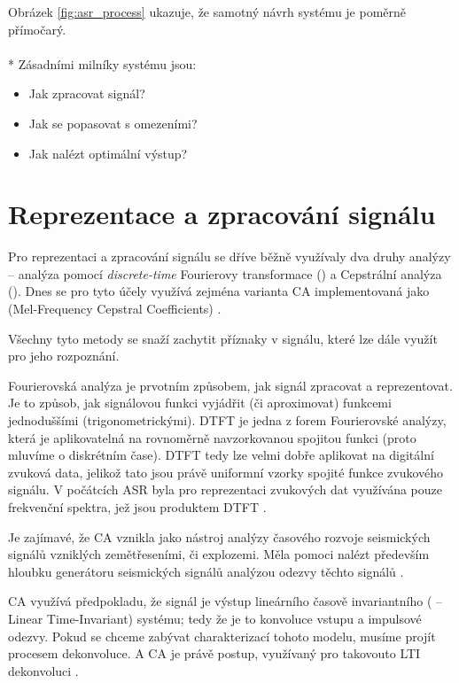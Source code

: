Obrázek \ref{fig:asr_process} ukazuje, že samotný návrh systému je poměrně přímočarý.
\\\\*
Zásadními milníky systému jsou:

\begin{itemize}
\item Jak zpracovat signál?
\item Jak se popasovat s omezeními?
\item Jak nalézt optimální výstup?
\end{itemize}

\section{Reprezentace a zpracování signálu}

Pro reprezentaci a zpracování signálu se dříve běžně využívaly dva druhy analýzy -- analýza pomocí {\sl discrete-time} Fourierovy transformace () a Cepstrální analýza (). Dnes se pro tyto účely využívá zejména varianta CA implementovaná jako  (Mel-Frequency Cepstral Coefficients) \cite{sahi_2012}.

Všechny tyto metody se snaží zachytit příznaky v signálu, které lze dále využít pro jeho rozpoznání.

Fourierovská analýza je prvotním způsobem, jak signál zpracovat a reprezentovat. Je to způsob, jak signálovou funkci vyjádřit (či aproximovat) funkcemi jednoduššími (trigonometrickými). DTFT je jedna z forem Fourierovské analýzy, která je aplikovatelná na rovnoměrně navzorkovanou spojitou funkci (proto mluvíme o diskrétním čase). DTFT tedy lze velmi dobře aplikovat na digitální zvuková data, jelikož tato jsou právě uniformní vzorky spojité funkce zvukového signálu. V počátcích ASR byla pro reprezentaci zvukových dat využívána pouze frekvenční spektra, jež jsou produktem DTFT \cite{shaug_2003}.

Je zajímavé, že CA vznikla jako nástroj analýzy časového rozvoje seismických signálů vzniklých zemětřeseními, či explozemi. Měla pomoci nalézt především hloubku generátoru seismických signálů analýzou odezvy těchto signálů \cite{bogert_1963}.

CA využívá předpokladu, že signál je výstup lineárního časově invariantního ( -- Linear Time-Invariant) systému; tedy že je to konvoluce vstupu a impulsové odezvy. Pokud se chceme zabývat charakterizací tohoto modelu, musíme projít procesem dekonvoluce. A CA je právě postup, využívaný pro takovouto LTI dekonvoluci \cite{tohkura_1987}.

